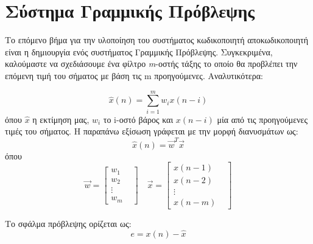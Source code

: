 \section{Σύστημα Γραμμικής Πρόβλεψης}

\par Το επόμενο βήμα για την υλοποίηση του συστήματος κωδικοποιητή αποκωδικοποιητή είναι η
δημιουργία ενός συστήματος Γραμμικής Πρόβλεψης. Συγκεκριμένα, καλούμαστε να σχεδιάσουμε ένα φίλτρο
\emph{m}-οστής τάξης το οποίο θα προβλέπει την επόμενη τιμή του σήματος με βάση τις m προηγούμενες.
Αναλυτικότερα:

\begin{equation}
  \label{eq:predictor}
  \hat{x}(n) = \sum_{i=1}^m w_i x(n -i)
\end{equation}
\noindent όπου $\hat{x}$ η εκτίμηση μας, $w_i$ το i-οστό βάρος και $x(n-i)$ μία από τις προηγούμενες
τιμές του σήματος. Η παραπάνω εξίσωση γράφεται με την μορφή διανυσμάτων ως:
\begin{equation}
  \label{eq:vectorized_predictor}
  \hat{x}(n) = \vec{w}^T\vec{x}
\end{equation}
\noindent όπου
\begin{equation}
  \label{eq:params_vector}
  \vec{w} = \begin{bmatrix}
    w_1 & \\
    w_2  \\
    \vdots \\
    w_m
  \end{bmatrix}
  \quad
  \vec{x} = \begin{bmatrix}
    x(n-1) & \\
    x(n-2)  \\
    \vdots \\
    x(n-m)
  \end{bmatrix}
\end{equation}
\par Το σφάλμα πρόβλεψης ορίζεται ως:
\begin{equation}
  \label{eq:pred_error}
  e = x(n) - \hat{x}
\end{equation}

